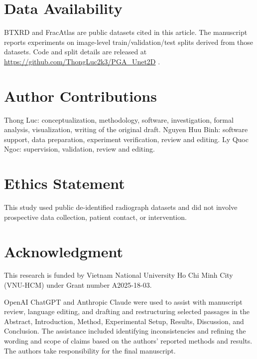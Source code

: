 \section*{Data Availability}
BTXRD and FracAtlas are public datasets cited in this article. The manuscript reports experiments on image-level train/validation/test splits derived from those datasets. Code and split details are released at \url{https://github.com/ThongLuc2k3/PGA_Unet2D} \cite{b14}.

\section*{Author Contributions}
Thong Luc: conceptualization, methodology, software, investigation, formal analysis, visualization, writing of the original draft. Nguyen Huu Binh: software support, data preparation, experiment verification, review and editing. Ly Quoc Ngoc: supervision, validation, review and editing.

\section*{Ethics Statement}
This study used public de-identified radiograph datasets and did not involve prospective data collection, patient contact, or intervention.

\section*{Acknowledgment}
This research is funded by Vietnam National University Ho Chi Minh City (VNU-HCM) under Grant number A2025-18-03.

OpenAI ChatGPT and Anthropic Claude were used to assist with manuscript review, language editing, and drafting and restructuring selected passages in the Abstract, Introduction, Method, Experimental Setup, Results, Discussion, and Conclusion. The assistance included identifying inconsistencies and refining the wording and scope of claims based on the authors' reported methods and results. The authors take responsibility for the final manuscript.

